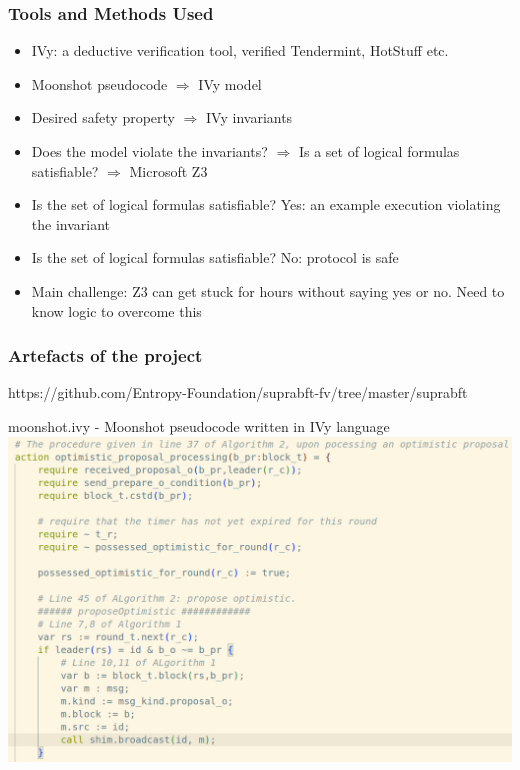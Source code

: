 \documentclass{beamer}
\begin{document}
\begin{frame}
    \frametitle{Tools and Methods Used}
    \begin{itemize}
        \item \alert{IVy}: a deductive
            verification tool, verified Tendermint, HotStuff etc.
            \pause
            \vfill
        \item Moonshot pseudocode $\Rightarrow$ IVy model
            \pause
            \vfill
        \item Desired safety property $\Rightarrow$ IVy invariants
            \pause
            \vfill
        \item Does the model violate the invariants? $\Rightarrow$ Is a set of
            logical formulas satisfiable? \pause $\Rightarrow$ Microsoft Z3
            \pause
            \vfill
        \item Is the set of logical formulas satisfiable? \alert{Yes}:
            an example execution violating the invariant
            \pause
            \vfill
        \item Is the set of logical formulas satisfiable? \alert{No}:
            protocol is safe
            \pause
            \vfill
        \item Main challenge: Z3 can get stuck for hours without
            saying yes or no. \pause Need to know logic to overcome
            this
    \end{itemize}
\end{frame}

\begin{frame}
    \frametitle{Artefacts of the project}
     https://github.com/Entropy-Foundation/suprabft-fv/tree/master/suprabft    

     \alert{moonshot.ivy} - Moonshot pseudocode written in IVy
     language\\
     \includegraphics[scale=0.25]{OptimisticPropProc.png}
\end{frame}
\end{document}
